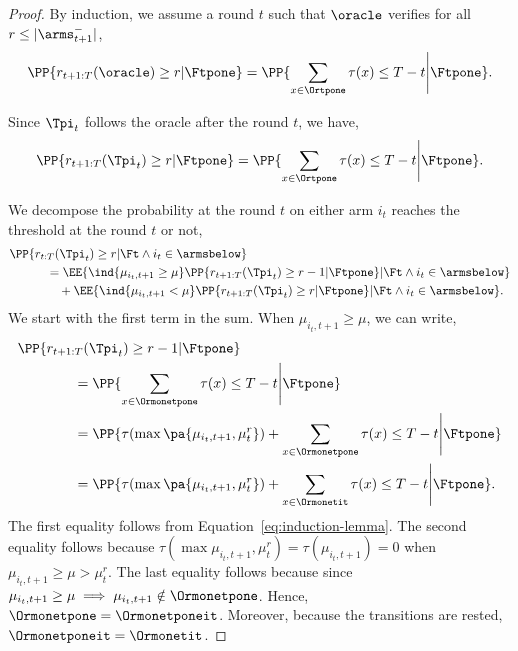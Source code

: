 \begin{proof}
By induction, we assume a round $t$ such that $\oracle$ verifies for all $r\leq |\arms_{t+1}^-|$, 
\begin{equation*}
\PP{r_{t+1:T}(\oracle) \geq r| \Ftpone} =  \PP{\sum_{x \in \Ortpone} \tau(x) \leq T - t  \Bigg| \Ftpone}. 
\end{equation*}

Since $\Tpi_{t}$ follows the oracle after the round $t$, we have,
\begin{equation}
\label{eq:induction-lemma}
\PP{r_{t+1:T}(\Tpi_t) \geq r| \Ftpone} =  \PP{\sum_{x \in \Ortpone} \tau(x) \leq T - t  \Bigg| \Ftpone}. 
\end{equation} 

We decompose the probability at the round $t$ on either arm $i_t$ reaches the threshold at the round $t$ or not, 
 \begin{align}
 &\PP{r_{t:T}(\Tpi_t) \geq r| \Ft\land i_t \in \armsbelow} \nonumber\\
 &\qquad \quad = \EE{ \ind{\mu_{i_t,t+1} \geq \mu} \PP{r_{t+1:T}(\Tpi_t) \geq r-1| \Ftpone}| \Ft \land i_t\in \armsbelow}\nonumber \\
& \qquad \qquad + \EE{ \ind{\mu_{i_t,t+1} < \mu} \PP{r_{t+1:T}(\Tpi_t) \geq r| \Ftpone} | \Ft\land i_t\in \armsbelow}. 
\label{eq:split-on-muit}
 \end{align}
%
We start with the first term in the sum. When $\mu_{i_t,t+1} \geq \mu$, we can write,
\begin{align}
&\PP{r_{t+1:T}(\Tpi_t) \geq r-1| \Ftpone} \\
&\qquad \qquad= \PP{\sum_{x \in \Ormonetpone} \tau(x) \leq T - t \Bigg| \Ftpone}\nonumber\\
&\qquad \qquad=  \PP{ \tau(\max\pa{\mu_{i_t,t+1}, \mu^{r}_{t}})+ \sum_{x \in \Ormonetpone} \tau(x) \leq T -t \Bigg| \Ftpone}\nonumber \\
&\qquad \qquad=  \PP{ \tau(\max\pa{\mu_{i_t,t+1}, \mu^{r}_{t}})+ \sum_{x \in \Ormonetit} \tau(x) \leq T - t \Bigg| \Ftpone}.
\label{eq:muit-above-mu}
\end{align}
The first equality follows from Equation~\ref{eq:induction-lemma}. The second equality follows because $\tau(\max{\mu_{i_t,t+1}, \mu^{r}_{t}}) = \tau(\mu_{i_t,t+1}) = 0$ when $\mu_{i_t,t+1} \geq \mu > \mu^{r}_{t}$. The last equality follows because since $\mu_{i_t,t+1} \geq \mu \implies \mu_{i_t,t+1} \notin\Ormonetpone$. Hence,  $\Ormonetpone = \Ormonetponeit$. Moreover, because the transitions are rested, $\Ormonetponeit = \Ormonetit$. 


\end{proof}
